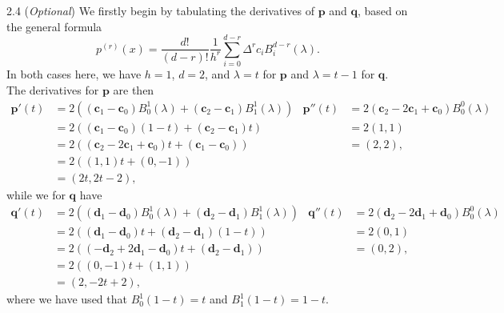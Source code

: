 \begin{solution}{2.4 (\textit{Optional})}
    We firstly begin by tabulating the derivatives of $\mathbf{p}$ and $\mathbf{q}$, based on the general formula
    \begin{equation*}
        p^{(r)}(x) = \frac{d!}{(d - r)!} \frac{1}{h^r} \sum_{i=0}^{d-r} \Delta^r c_{i} B_i^{d-r}(\lambda).
    \end{equation*}
    In both cases here, we have $h = 1$, $d = 2$, and $\lambda = t$ for $\mathbf{p}$ and $\lambda = t - 1$ for $\mathbf{q}$.
    The derivatives for $\mathbf{p}$ are then
    \begin{align*}
        \mathbf{p}'(t) &= 2 \left(\left( \mathbf{c}_1 - \mathbf{c}_0 \right) B_0^1(\lambda) + \left( \mathbf{c}_2 - \mathbf{c}_1 \right) B_1^1(\lambda)\right) &
        \mathbf{p}''(t) &= 2 \left( \mathbf{c}_2 - 2 \mathbf{c}_1 + \mathbf{c}_0 \right) B_0^0(\lambda) \\
        &= 2 \left(\left( \mathbf{c}_1 - \mathbf{c}_0 \right) (1 - t) + \left( \mathbf{c}_2 - \mathbf{c}_1 \right) t\right) &
        &= 2 \left(1, 1\right) \\
        &= 2 \left(
            (\mathbf{c}_2 - 2 \mathbf{c}_1 + \mathbf{c}_0)t + (\mathbf{c}_1 - \mathbf{c}_0)
        \right) &
        &= (2, 2), \\
        &= 2 \left(
            (1, 1)t + (0, -1)
        \right) \\
        &= (2t, 2t - 2),
    \end{align*}
    while we for $\mathbf{q}$ have
    \begin{align*}
        \mathbf{q}'(t) &= 2 \left(\left( \mathbf{d}_1 - \mathbf{d}_0 \right) B_0^1(\lambda) + \left( \mathbf{d}_2 - \mathbf{d}_1 \right) B_1^1(\lambda)\right) &
        \mathbf{q}''(t) &= 2 \left( \mathbf{d}_2 - 2 \mathbf{d}_1 + \mathbf{d}_0 \right) B_0^0(\lambda) \\
        &= 2 \left(\left( \mathbf{d}_1 - \mathbf{d}_0 \right) t + \left( \mathbf{d}_2 - \mathbf{d}_1 \right) (1 - t)\right) &
        &= 2 \left(0, 1\right) \\
        &= 2 \left(
            (-\mathbf{d}_2 + 2 \mathbf{d}_1 - \mathbf{d}_0)t + (\mathbf{d}_2 - \mathbf{d}_1)
        \right) &
        &= (0, 2), \\
        &= 2 \left(
            (0, -1)t + (1, 1)
        \right) \\
        &= (2, - 2t + 2),
    \end{align*}
    where we have used that $B_0^1(1 - t) = t$ and $B_1^1(1 - t) = 1 - t$.

\end{solution}
